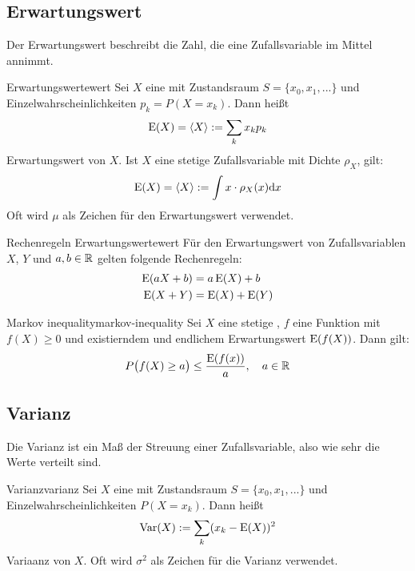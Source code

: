 \subsection{Erwartungswert}

Der Erwartungswert beschreibt die Zahl, die eine Zufallsvariable im Mittel
annimmt.

\begin{definition}{Erwartungswert}{ewert}
Sei $X$ eine  mit Zustandsraum $S=\{x_0, x_1,
...\}$ und Einzelwahrscheinlichkeiten $p_k=P(X=x_k)$. Dann heißt
\[
\operatorname{E}(X) =\langle X\rangle := \sum_k x_kp_k
\]
Erwartungswert von $X$. Ist $X$ eine stetige Zufallsvariable mit Dichte
$\rho_X$, gilt:
\[
\operatorname{E}(X) =\langle X\rangle := \int x\cdot\rho_X(x)\mathrm{d}x
\]
Oft wird $\mu$ als Zeichen für den Erwartungswert verwendet.
\end{definition}

\begin{theorem}{Rechenregeln Erwartungswert}{ewert}
Für den Erwartungswert von Zufallsvariablen $X$, $Y$ und $a,b\in\mathbb{R}$ gelten
folgende Rechenregeln:
\begin{align*}
\operatorname{E}(aX+b) &= a\operatorname{E}(X) + b \\
\operatorname{E}(X+Y) &= \operatorname{E}(X) + \operatorname{E}(Y)
\end{align*}
\end{theorem}

\begin{theorem}{Markov inequality}{markov-inequality}
Sei $X$ eine stetige , $f$ eine Funktion mit
$f(X)\ge 0$ und existierndem und endlichem Erwartungswert $\operatorname{E}(f(X))$. Dann gilt:
\[
P\big(f(X)\ge a\big)\le \frac{\operatorname{E}(f(x))}{a},\quad a\in\mathbb{R}
\]
\end{theorem}


\subsection{Varianz}

Die Varianz ist ein Maß der Streuung einer Zufallsvariable, also wie sehr die
Werte verteilt sind.

\begin{definition}{Varianz}{varianz}
Sei $X$ eine  mit Zustandsraum $S=\{x_0, x_1,
...\}$ und Einzelwahrscheinlichkeiten $P(X=x_k)$. Dann heißt
\[
\operatorname{Var}(X) := \sum_k (x_k - \operatorname{E}(X))^2
\]
Variaanz von $X$. Oft wird $\sigma^2$ als Zeichen für die Varianz verwendet.
\end{definition}

